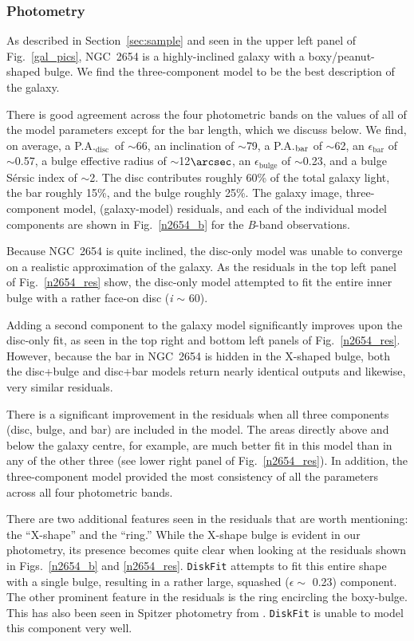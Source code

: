 \documentclass[a4paper,fleqn,usenatbib]{mnras}
\begin{document}
\subsubsection{Photometry}
\label{sec:n2654phot}

As described in Section~\ref{sec:sample} and seen in the upper left panel of Fig.~\ref{gal_pics}, NGC~2654 is a highly-inclined galaxy with a boxy/peanut-shaped bulge. We find the three-component model to be the best description of the galaxy. 

There is good agreement across the four photometric bands on the values of all of the model parameters except for the bar length, which we discuss below. We find, on average, a P.A.$_{\mathrm{disc}}$\ of $\sim$66\degr, an inclination of $\sim$79\degr, a P.A.$_{\rm bar}$ of $\sim$62\degr, an $\epsilon_{\mathrm{bar}}$ of $\sim$0.57, a bulge effective radius of $\sim$12$\arcsec$,  an $\epsilon_{\mathrm{bulge}}$ of $\sim$0.23, and a bulge S\'{e}rsic index of $\sim$2. The disc contributes roughly 60\% of the total galaxy light, the bar roughly 15\%, and the bulge roughly 25\%.  The galaxy image, three-component model, (galaxy-model) residuals, and each of the individual model components are shown in Fig.~\ref{n2654_b} for the \textit{B}-band observations.

Because NGC~2654 is quite inclined, the disc-only model was unable to converge on a realistic approximation of the galaxy. As the residuals in the top left panel of Fig.~\ref{n2654_res} show, the disc-only model attempted to fit the entire inner bulge with a rather face-on disc (\textit{i} $\sim$ 60\degr). 

Adding a second component to the galaxy model significantly improves upon the disc-only fit, as seen in the top right and bottom left panels of Fig.~\ref{n2654_res}. However, because the bar in NGC~2654 is hidden in the X-shaped bulge, both the disc+bulge and disc+bar models return nearly identical outputs and likewise, very similar residuals. 

There is a significant improvement in the residuals when all three components (disc, bulge, and bar) are included in the model. The areas directly above and below the galaxy centre, for example, are much better fit in this model than in any of the other three (see lower right panel of Fig.~\ref{n2654_res}). In addition, the three-component model provided the most consistency of all the parameters across all four photometric bands.

There are two additional features seen in the residuals that are worth mentioning: the ``X-shape'' and the ``ring.''  While the X-shape bulge is evident in our photometry, its presence becomes quite clear when looking at the residuals shown in Figs.~\ref{n2654_b} and \ref{n2654_res}. \texttt{DiskFit} attempts to fit this entire shape with a single bulge, resulting in a rather large, squashed ($\epsilon \sim$ 0.23) component. The other prominent feature in the residuals is the ring encircling the boxy-bulge. This has also been seen in Spitzer photometry from \citet{buta2015}. \texttt{DiskFit} is unable to model this component very well.
\end{document}
